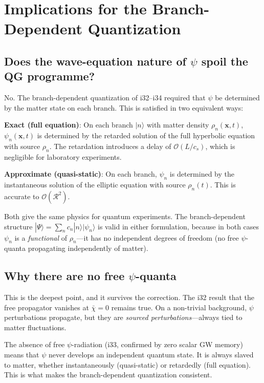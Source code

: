 \documentclass[12pt,a4paper]{article}
\newcommand{\order}[1]{\mathcal{O}(#1)}
\begin{document}
\section{Implications for the Branch-Dependent Quantization}
\label{sec:implications}

\subsection{Does the wave-equation nature of $\psi$ spoil the QG programme?}

No. The branch-dependent quantization of i32--i34 required that $\psi$ be
determined by the matter state on each branch. This is satisfied in two
equivalent ways:

\textbf{Exact (full equation)}: On each branch $|n\rangle$ with matter
density $\rho_n(\mathbf{x},t)$, $\psi_n(\mathbf{x},t)$ is determined
by the retarded solution of the full hyperbolic equation with source
$\rho_n$. The retardation introduces a delay of $\order{L/c_s}$, which
is negligible for laboratory experiments.

\textbf{Approximate (quasi-static)}: On each branch, $\psi_n$ is
determined by the instantaneous solution of the elliptic equation with
source $\rho_n(t)$. This is accurate to $\order{\mathcal{R}^2}$.

Both give the same physics for quantum experiments. The branch-dependent
structure $|\Psi\rangle = \sum_n c_n|n\rangle|\psi_n\rangle$ is valid
in either formulation, because in both cases $\psi_n$ is a \emph{functional}
of $\rho_n$---it has no independent degrees of freedom (no free
$\psi$-quanta propagating independently of matter).

\subsection{Why there are no free $\psi$-quanta}

This is the deepest point, and it survives the correction. The i32 result
that the free propagator vanishes at $\bar\chi = 0$ remains true. On a
non-trivial background, $\psi$ perturbations propagate, but they are
\emph{sourced perturbations}---always tied to matter fluctuations.

The absence of free $\psi$-radiation (i33, confirmed by zero scalar GW
memory) means that $\psi$ never develops an independent quantum state.
It is always slaved to matter, whether instantaneously (quasi-static)
or retardedly (full equation). This is what makes the branch-dependent
quantization consistent.
\end{document}
